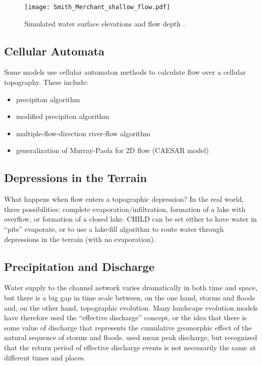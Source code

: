 \documentclass[12pt,reqno]{amsart}
\begin{document}
\begin{figure}
\centering
\texttt{[image: Smith\_Merchant\_shallow\_flow.pdf]}
\captionsetup{width=4.8in}
\caption{Simulated water surface elevations and flow depth \citep{birnir2001scaling}.}
\label{fig:shalflow}
\end{figure}

\subsection{Cellular Automata}

Some models use cellular automaton methods to calculate flow over a cellular topography. These include:
\begin{itemize}
\item \citet{chase1992fluvial} precipiton algorithm
\item \citet{crave2001stochastic} modified precipiton algorithm
\item \citet{murray1994cellular} multiple-flow-direction river-flow algorithm
\item \citet{coulthard1996cellular} generalization of Murray-Paola for 2D flow (CAESAR model)
\end{itemize}

\subsection{Depressions in the Terrain}

What happens when flow enters a topographic depression? In the real world, three possibilities: complete evaporation/infiltration, formation of a lake with overflow, or formation of a closed lake. CHILD can be set either to have water in ``pits'' evaporate, or to use a lake-fill algorithm to route water through depressions in the terrain (with no evaporation). 

\subsection{Precipitation and Discharge}

Water supply to the channel network varies dramatically in both time
and space, but there is a big gap in time scale between, on the one hand, storms and
floods and, on the other hand, topographic evolution. Many landscape
evolution models have therefore used the ``effective discharge''
concept, or the idea that there is some value of discharge that
represents the cumulative geomorphic effect of the natural sequence of
storms and floods. \citet{willgoose1991coupled} used mean peak
discharge, but \citet{huang2006evaluation} recognized that the return
period of effective
discharge events is not necessarily the same at different times and
places.
\end{document}
